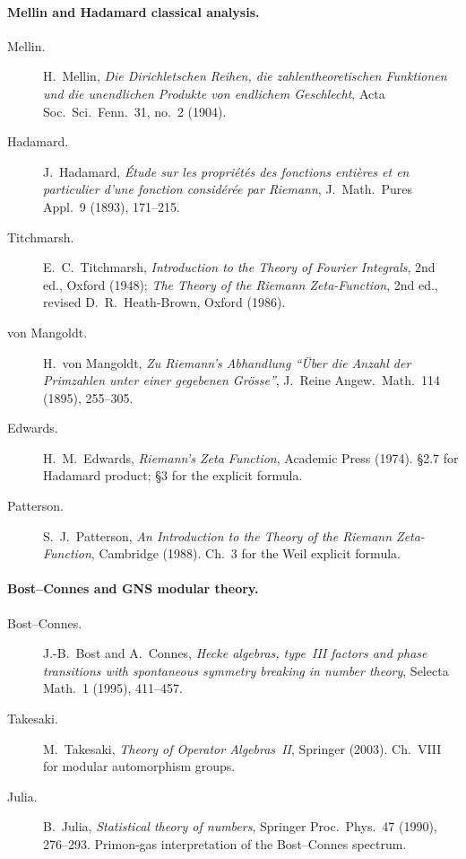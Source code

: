 \paragraph{Mellin and Hadamard classical analysis.}
\begin{description}
\item[Mellin.] H.~Mellin, \emph{Die Dirichletschen Reihen, die
zahlentheoretischen Funktionen und die unendlichen Produkte von
endlichem Geschlecht}, Acta Soc.~Sci.~Fenn.~31, no.~2 (1904).
\item[Hadamard.] J.~Hadamard, \emph{\'Etude sur les propri\'et\'es
des fonctions enti\`eres et en particulier d'une fonction consid\'er\'ee
par Riemann}, J.~Math.~Pures Appl.~9 (1893), 171--215.
\item[Titchmarsh.] E.~C.~Titchmarsh, \emph{Introduction to the Theory
of Fourier Integrals}, 2nd ed., Oxford (1948); \emph{The Theory of
the Riemann Zeta-Function}, 2nd ed., revised D.~R.~Heath-Brown, Oxford
(1986).
\item[von Mangoldt.] H.~von Mangoldt, \emph{Zu Riemann's Abhandlung
``\"Uber die Anzahl der Primzahlen unter einer gegebenen Gr\"osse''},
J.~Reine Angew.~Math.~114 (1895), 255--305.
\item[Edwards.] H.~M.~Edwards, \emph{Riemann's Zeta Function},
Academic Press (1974). \S2.7 for Hadamard product; \S3 for the
explicit formula.
\item[Patterson.] S.~J.~Patterson, \emph{An Introduction to the Theory
of the Riemann Zeta-Function}, Cambridge (1988). Ch.~3 for the Weil
explicit formula.
\end{description}

\paragraph{Bost--Connes and GNS modular theory.}
\begin{description}
\item[Bost--Connes.] J.-B.~Bost and A.~Connes, \emph{Hecke algebras,
type~III factors and phase transitions with spontaneous symmetry
breaking in number theory}, Selecta Math.~1 (1995), 411--457.
\item[Takesaki.] M.~Takesaki, \emph{Theory of Operator Algebras~II},
Springer (2003). Ch.~VIII for modular automorphism groups.
\item[Julia.] B.~Julia, \emph{Statistical theory of numbers}, Springer
Proc.~Phys.~47 (1990), 276--293. Primon-gas interpretation of the
Bost--Connes spectrum.
\end{description}

